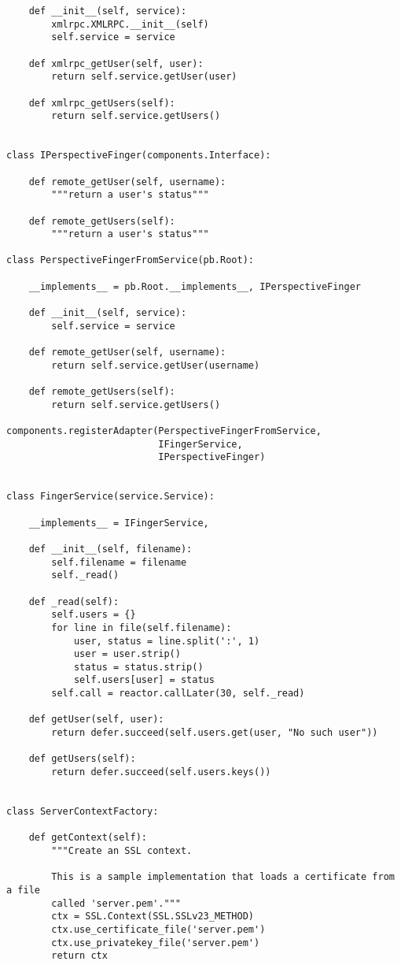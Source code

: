 \begin{verbatim}
    def __init__(self, service):
        xmlrpc.XMLRPC.__init__(self)
        self.service = service

    def xmlrpc_getUser(self, user):
        return self.service.getUser(user)

    def xmlrpc_getUsers(self):
        return self.service.getUsers()


class IPerspectiveFinger(components.Interface):

    def remote_getUser(self, username):
        """return a user's status"""

    def remote_getUsers(self):
        """return a user's status"""

class PerspectiveFingerFromService(pb.Root):

    __implements__ = pb.Root.__implements__, IPerspectiveFinger

    def __init__(self, service):
        self.service = service

    def remote_getUser(self, username):
        return self.service.getUser(username)

    def remote_getUsers(self):
        return self.service.getUsers()

components.registerAdapter(PerspectiveFingerFromService,
                           IFingerService,
                           IPerspectiveFinger)


class FingerService(service.Service):

    __implements__ = IFingerService,

    def __init__(self, filename):
        self.filename = filename
        self._read()

    def _read(self):
        self.users = {}
        for line in file(self.filename):
            user, status = line.split(':', 1)
            user = user.strip()
            status = status.strip()
            self.users[user] = status
        self.call = reactor.callLater(30, self._read)

    def getUser(self, user):
        return defer.succeed(self.users.get(user, "No such user"))

    def getUsers(self):
        return defer.succeed(self.users.keys())


class ServerContextFactory:

    def getContext(self):
        """Create an SSL context.

        This is a sample implementation that loads a certificate from a file
        called 'server.pem'."""
        ctx = SSL.Context(SSL.SSLv23_METHOD)
        ctx.use_certificate_file('server.pem')
        ctx.use_privatekey_file('server.pem')
        return ctx



\end{verbatim}
